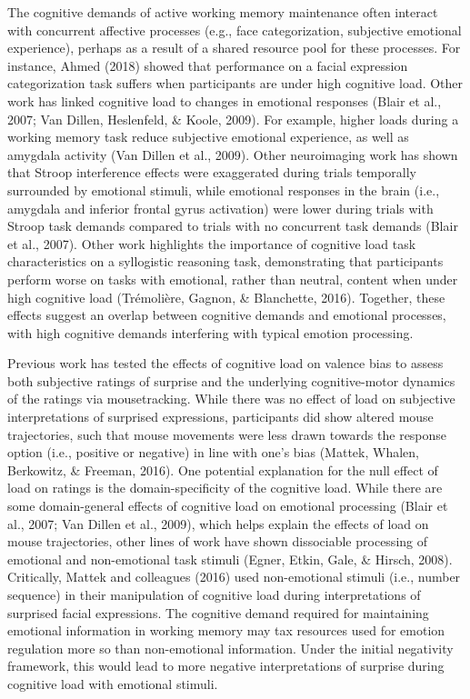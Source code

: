 \documentclass[man]{apa6}
\begin{document}
The cognitive demands of active working memory maintenance often interact with concurrent affective processes (e.g., face categorization, subjective emotional experience), perhaps as a result of a shared resource pool for these processes. For instance, Ahmed (2018) showed that performance on a facial expression categorization task suffers when participants are under high cognitive load. Other work has linked cognitive load to changes in emotional responses (Blair et al., 2007; Van Dillen, Heslenfeld, \& Koole, 2009). For example, higher loads during a working memory task reduce subjective emotional experience, as well as amygdala activity (Van Dillen et al., 2009). Other neuroimaging work has shown that Stroop interference effects were exaggerated during trials temporally surrounded by emotional stimuli, while emotional responses in the brain (i.e., amygdala and inferior frontal gyrus activation) were lower during trials with Stroop task demands compared to trials with no concurrent task demands (Blair et al., 2007). Other work highlights the importance of cognitive load task characteristics on a syllogistic reasoning task, demonstrating that participants perform worse on tasks with emotional, rather than neutral, content when under high cognitive load (Trémolière, Gagnon, \& Blanchette, 2016). Together, these effects suggest an overlap between cognitive demands and emotional processes, with high cognitive demands interfering with typical emotion processing.

Previous work has tested the effects of cognitive load on valence bias to assess both subjective ratings of surprise and the underlying cognitive-motor dynamics of the ratings via mousetracking. While there was no effect of load on subjective interpretations of surprised expressions, participants did show altered mouse trajectories, such that mouse movements were less drawn towards the response option (i.e., positive or negative) in line with one's bias (Mattek, Whalen, Berkowitz, \& Freeman, 2016). One potential explanation for the null effect of load on ratings is the domain-specificity of the cognitive load. While there are some domain-general effects of cognitive load on emotional processing (Blair et al., 2007; Van Dillen et al., 2009), which helps explain the effects of load on mouse trajectories, other lines of work have shown dissociable processing of emotional and non-emotional task stimuli (Egner, Etkin, Gale, \& Hirsch, 2008). Critically, Mattek and colleagues (2016) used non-emotional stimuli (i.e., number sequence) in their manipulation of cognitive load during interpretations of surprised facial expressions. The cognitive demand required for maintaining emotional information in working memory may tax resources used for emotion regulation more so than non-emotional information. Under the initial negativity framework, this would lead to more negative interpretations of surprise during cognitive load with emotional stimuli.
\end{document}
